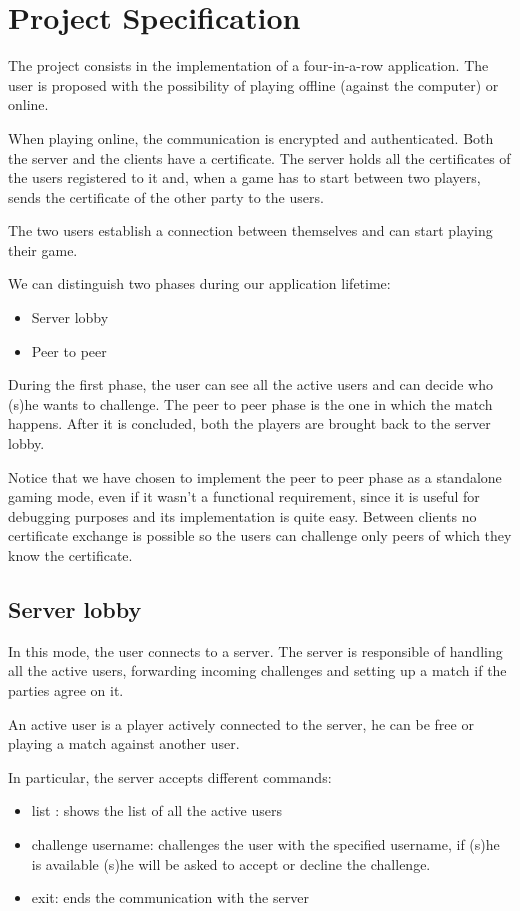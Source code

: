 \section{Project Specification}
The project consists in the implementation of a four-in-a-row application. 
The user is proposed with the possibility of playing offline (against the computer) or online.

When playing online, the communication is encrypted and authenticated.
Both the server and the clients have a certificate. The server holds all the certificates of the users registered to it and, when a game has to start between two players, sends the certificate of the other party to the users.

The two users establish a connection between themselves and can start playing their game.

We can distinguish two phases during our application lifetime:
\begin{itemize}
	\item Server lobby
	\item Peer to peer
\end{itemize}

During the first phase, the user can see all the active users and can decide who (s)he wants to challenge.
The peer to peer phase is the one in which the match happens. After it is concluded, both the players are brought back to the server lobby.

Notice that we have chosen to implement the peer to peer phase as a standalone gaming mode, even if it wasn't a functional requirement, since it is useful for debugging purposes and its implementation is quite easy. Between clients no certificate exchange is possible so the users can challenge only peers of which they know the certificate.

\subsection{Server lobby}
In this mode, the user connects to a server. The server is responsible of handling all the active users, forwarding incoming challenges and setting up a match if the parties agree on it.

An active user is a player actively connected to the server, he can be free or playing a match against another user.

In particular, the server accepts different commands:
\begin{itemize}
	\item list : shows the list of all the active users
	\item challenge username:  challenges the user with the specified username, if (s)he is available (s)he will be asked to accept or decline the challenge.
	\item exit: ends the communication with the server
\end{itemize}

